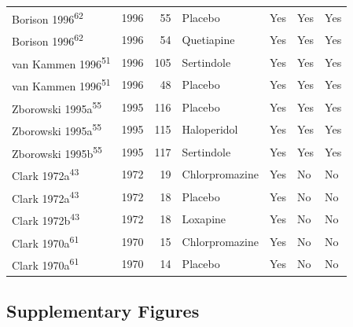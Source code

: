 \documentclass[
  9pt,
  english,
  ,jou,floatsintext]{apa6}
\begin{document}
\begin{longtable}[]{@{}lrrllll@{}}
Borison 1996\textsuperscript{62} & 1996 & 55 & Placebo & Yes & Yes & Yes \\
Borison 1996\textsuperscript{62} & 1996 & 54 & Quetiapine & Yes & Yes & Yes \\
van Kammen 1996\textsuperscript{51} & 1996 & 105 & Sertindole & Yes & Yes & Yes \\
van Kammen 1996\textsuperscript{51} & 1996 & 48 & Placebo & Yes & Yes & Yes \\
Zborowski 1995a\textsuperscript{55} & 1995 & 116 & Placebo & Yes & Yes & Yes \\
Zborowski 1995a\textsuperscript{55} & 1995 & 115 & Haloperidol & Yes & Yes & Yes \\
Zborowski 1995b\textsuperscript{55} & 1995 & 117 & Sertindole & Yes & Yes & Yes \\
Clark 1972a\textsuperscript{43} & 1972 & 19 & Chlorpromazine & Yes & No & No \\
Clark 1972a\textsuperscript{43} & 1972 & 18 & Placebo & Yes & No & No \\
Clark 1972b\textsuperscript{43} & 1972 & 18 & Loxapine & Yes & No & No \\
Clark 1970a\textsuperscript{61} & 1970 & 15 & Chlorpromazine & Yes & No & No \\
Clark 1970a\textsuperscript{61} & 1970 & 14 & Placebo & Yes & No & No \\
\bottomrule
\end{longtable}

\clearpage

\hypertarget{supplementary-figures}{%
\subsection{Supplementary Figures}\label{supplementary-figures}}
\end{document}
